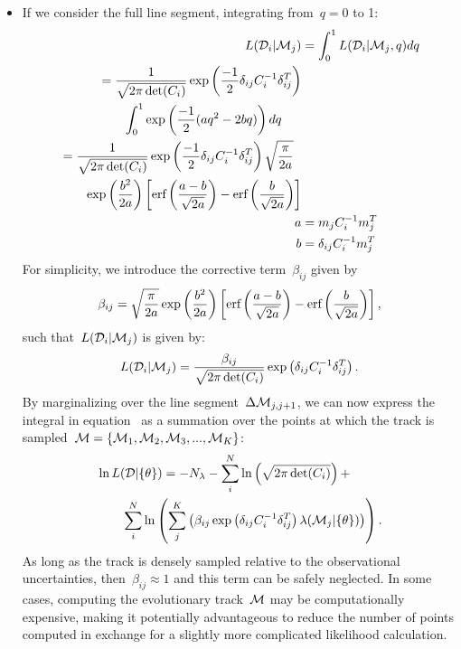 \documentclass[ms.tex]{subfiles}
\begin{document}
\begin{itemize}
	\item If we consider the full line segment, integrating from~$q = 0$ to 1:
	\begin{subequations}\begin{align}
	L(\mathcal{D}_i | \mathcal{M}_j) &= \int_0^1 L(\mathcal{D}_i | \mathcal{M}_j,
	q) dq
	\\
	\begin{split}
	&= \frac{1}{\sqrt{2\pi \det(C_i)}}
	\exp\left(\frac{-1}{2}\delta_{ij}C_i^{-1}\delta_{ij}^T\right)
	\\
	&\qquad \int_0^1 \exp\left(\frac{-1}{2}(aq^2 - 2bq)\right)dq
	\end{split}
	\\
	\begin{split}
	&= \frac{1}{\sqrt{2\pi \det(C_i)}}
	\exp\left(\frac{-1}{2}\delta_{ij}C_i^{-1}\delta_{ij}^T\right)
	\sqrt{\frac{\pi}{2a}}
	\\
	&\qquad \exp\left(\frac{b^2}{2a}\right)
	\left[\text{erf}\left(\frac{a - b}{\sqrt{2a}}\right) -
	\text{erf}\left(\frac{b}{\sqrt{2a}}\right)\right]
	\end{split}
	\\
	a &= m_j C_i^{-1} m_j^T
	\\
	b &= \delta_{ij} C_i^{-1} m_j^T
	\end{align}\end{subequations}
	For simplicity, we introduce the corrective term~$\beta_{ij}$ given by
	\begin{equation}
	\beta_{ij} = \sqrt{\frac{\pi}{2a}}
	\exp\left(\frac{b^2}{2a}\right)
	\left[
	\text{erf}\left(\frac{a - b}{\sqrt{2a}}\right) -
	\text{erf}\left(\frac{b}{\sqrt{2a}}\right)
	\right],
	\label{eq:corrective_beta}
	\end{equation}
	such that~$L(\mathcal{D}_i | \mathcal{M}_j)$ is given by:
	\begin{equation}
	L(\mathcal{D}_i | \mathcal{M}_j) = \frac{\beta_{ij}}{\sqrt{2\pi \det(C_i)}}
	\exp\left(\delta_{ij}C_i^{-1}\delta_{ij}^T\right).
	\end{equation}
	By marginalizing over the line segment~$\Delta\mathcal{M}_{j,j + 1}$, we can
	now express the integral in equation~ as a summation
	over the points at which the track is sampled~$\mathcal{M} = \{\mathcal{M}_1,
	\mathcal{M}_2, \mathcal{M}_3, ..., \mathcal{M}_K\}$:
	\begin{equation}\begin{split}
	&\ln L(\mathcal{D} | \{\theta\}) = -N_\lambda -
	\sum_i^N \ln\left(\sqrt{2\pi \det(C_i)}\right) +
	\\ &\qquad \sum_i^N \ln \left(
	\sum_j^K \left(
	\beta_{ij}\exp\left(\delta_{ij}C_i^{-1}\delta_{ij}^T\right)
	\lambda(\mathcal{M}_j | \{\theta\})
	\right)
	\right).
	\end{split}\end{equation}
	As long as the track is densely sampled relative to the observational
	uncertainties, then~$\beta_{ij} \approx 1$ and this term can be safely
	neglected.
	In some cases, computing the evolutionary track~$\mathcal{M}$ may be
	computationally expensive, making it potentially advantageous to reduce the
	number of points computed in exchange for a slightly more complicated
	likelihood calculation.


\end{itemize}
\end{document}

